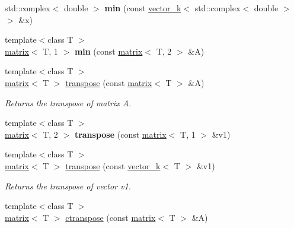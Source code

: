\begin{DoxyCompactItemize}
\item 
\hypertarget{namespacekeycpp_aa56d65d68004f40352c8e33bffb0e0eb}{std\-::complex$<$ double $>$ {\bfseries min} (const \hyperlink{classkeycpp_1_1vector__k}{vector\-\_\-k}$<$ std\-::complex$<$ double $>$ $>$ \&x)}\label{namespacekeycpp_aa56d65d68004f40352c8e33bffb0e0eb}

\item 
\hypertarget{namespacekeycpp_aa14bd8b7f4585287019e5e6ebff8222b}{{\footnotesize template$<$class T $>$ }\\\hyperlink{classkeycpp_1_1matrix}{matrix}$<$ T, 1 $>$ {\bfseries min} (const \hyperlink{classkeycpp_1_1matrix}{matrix}$<$ T, 2 $>$ \&A)}\label{namespacekeycpp_aa14bd8b7f4585287019e5e6ebff8222b}

\item 
\hypertarget{namespacekeycpp_a7fd5ce0385e9cc7bed5b44ed8475e8aa}{{\footnotesize template$<$class T $>$ }\\\hyperlink{classkeycpp_1_1matrix}{matrix}$<$ T $>$ \hyperlink{namespacekeycpp_a7fd5ce0385e9cc7bed5b44ed8475e8aa}{transpose} (const \hyperlink{classkeycpp_1_1matrix}{matrix}$<$ T $>$ \&A)}\label{namespacekeycpp_a7fd5ce0385e9cc7bed5b44ed8475e8aa}

\begin{DoxyCompactList}\small\item\em Returns the transpose of matrix A. \end{DoxyCompactList}\item 
\hypertarget{namespacekeycpp_af86c195d39e32dd81020c07cab17baa9}{{\footnotesize template$<$class T $>$ }\\\hyperlink{classkeycpp_1_1matrix}{matrix}$<$ T, 2 $>$ {\bfseries transpose} (const \hyperlink{classkeycpp_1_1matrix}{matrix}$<$ T, 1 $>$ \&v1)}\label{namespacekeycpp_af86c195d39e32dd81020c07cab17baa9}

\item 
\hypertarget{namespacekeycpp_a24d241b78ac9d5764e08c3f03bdffd07}{{\footnotesize template$<$class T $>$ }\\\hyperlink{classkeycpp_1_1matrix}{matrix}$<$ T $>$ \hyperlink{namespacekeycpp_a24d241b78ac9d5764e08c3f03bdffd07}{transpose} (const \hyperlink{classkeycpp_1_1vector__k}{vector\-\_\-k}$<$ T $>$ \&v1)}\label{namespacekeycpp_a24d241b78ac9d5764e08c3f03bdffd07}

\begin{DoxyCompactList}\small\item\em Returns the transpose of vector v1. \end{DoxyCompactList}\item 
\hypertarget{namespacekeycpp_a14503c0419f365433d88fa081d473210}{{\footnotesize template$<$class T $>$ }\\\hyperlink{classkeycpp_1_1matrix}{matrix}$<$ T $>$ \hyperlink{namespacekeycpp_a14503c0419f365433d88fa081d473210}{ctranspose} (const \hyperlink{classkeycpp_1_1matrix}{matrix}$<$ T $>$ \&A)}\label{namespacekeycpp_a14503c0419f365433d88fa081d473210}


\end{DoxyCompactItemize}
